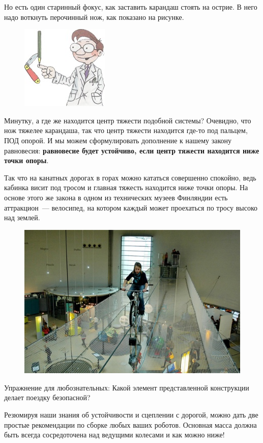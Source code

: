 Но есть один старинный фокус, как заставить карандаш стоять на острие. В него надо воткнуть перочинный нож, как показано на рисунке.
\begin{figure}[h!]
	\begin{center}
		\includegraphics[width=0.2\linewidth]{chapters/chapter8/images/8}
		\caption{}
		\label{ris:image8x8}
	\end{center}
\end{figure}

Минутку, а где же находится центр тяжести подобной системы? Очевидно, что нож тяжелее карандаша, так что центр тяжести находится где-то под пальцем, ПОД опорой. И мы можем сформулировать дополнение к нашему закону равновесия: {\bfseries равновесие будет устойчиво, если центр тяжести находится ниже точки опоры}.

Так что на канатных дорогах в горах можно кататься совершенно спокойно, ведь кабинка висит под тросом и главная тяжесть находится ниже точки опоры. На основе этого же закона в одном из технических музеев Финляндии есть аттракцион~--- велосипед, на котором каждый может проехаться по тросу  высоко над землей.
\begin{figure}[h!]
	\begin{center}
		\includegraphics[width=0.75\linewidth]{chapters/chapter8/images/9}
		\caption{}
		\label{ris:image8x9}
	\end{center}
\end{figure}

Упражнение для любознательных: Какой элемент представленной конструкции делает поездку безопасной?

Резюмируя наши знания об устойчивости и сцеплении с дорогой, можно дать две простые рекомендации по сборке любых ваших роботов. Основная масса должна быть всегда сосредоточена над ведущими колесами и как можно ниже!
